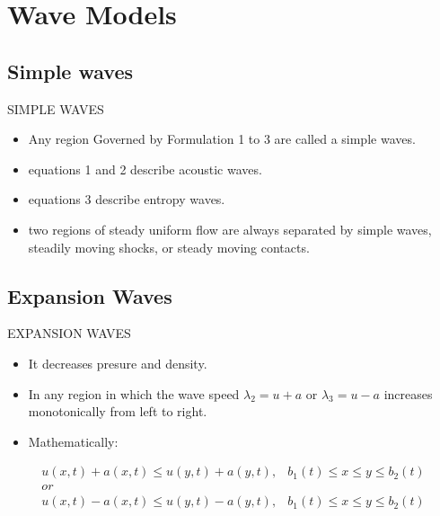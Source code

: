 \documentclass{beamer}
\begin{document}
\section{Wave Models}

\subsection{Simple waves}

\begin{frame}{SIMPLE WAVES}
  \begin{itemize}
   \item Any region Governed by Formulation 1 to 3 are called a simple waves.
   \item equations 1 and 2 describe acoustic waves.
   \item equations 3 describe entropy waves.
   \item two regions of steady uniform flow are always separated by simple waves, steadily moving shocks, or steady moving contacts.
  \end{itemize}
\end{frame}

\subsection{Expansion Waves}

\begin{frame}{EXPANSION WAVES}
  \begin{itemize}
   \item It decreases presure and density.
   \item In any region in which the wave speed $\lambda_2=u+a$ or $\lambda_3=u-a$ increases monotonically from left to right. 
   \item Mathematically:
  \end{itemize}
  \begin{equation}
  \begin{matrix}
  u(x,t)+a(x,t)\leq{u(y,t)+a(y,t)}, & b_1(t)\leq{x}\leq{y}\leq{b_2(t)}\\
  or \\
  u(x,t)-a(x,t)\leq{u(y,t)-a(y,t)}, & b_1(t)\leq{x}\leq{y}\leq{b_2(t)}
  \end{matrix}
  \end{equation} 
\end{frame}
\end{document}
